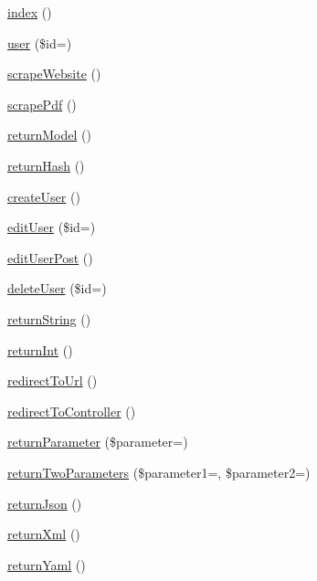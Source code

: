 \begin{DoxyCompactItemize}
\item 
\hyperlink{class_basic_a149eb92716c1084a935e04a8d95f7347}{index} ()
\item 
\hyperlink{class_basic_a6603546e99f9519b86989be128736ad6}{user} (\$id=\textquotesingle{}\textquotesingle{})
\item 
\hyperlink{class_basic_a48ffe9a27b91ce968b2bcf5e0a9d4069}{scrape\+Website} ()
\item 
\hyperlink{class_basic_a67dbb38567401c856d5361d6704874d5}{scrape\+Pdf} ()
\item 
\hyperlink{class_basic_a7cb6a02987f0faaef2ee4aff9198907e}{return\+Model} ()
\item 
\hyperlink{class_basic_a16df2136bd66a75022f350d583e6c060}{return\+Hash} ()
\item 
\hyperlink{class_basic_a967982ee98f05287bbdba812f6016947}{create\+User} ()
\item 
\hyperlink{class_basic_acd3b430aeceba0ebbda62330838d0c0b}{edit\+User} (\$id=\textquotesingle{}\textquotesingle{})
\item 
\hyperlink{class_basic_a445a1f2f42c756bf451de087e36b7193}{edit\+User\+Post} ()
\item 
\hyperlink{class_basic_a934aeeec370d904f3a58bde4d514259d}{delete\+User} (\$id=\textquotesingle{}\textquotesingle{})
\item 
\hyperlink{class_basic_a5bb666dcea19a9561c2047cfa25936bd}{return\+String} ()
\item 
\hyperlink{class_basic_a8d2918087022004ef5ad62d8f76a73d7}{return\+Int} ()
\item 
\hyperlink{class_basic_abf786273f796a96f5532dc60f9cec813}{redirect\+To\+Url} ()
\item 
\hyperlink{class_basic_a53f01fc4c43d1cecc497d9645f920407}{redirect\+To\+Controller} ()
\item 
\hyperlink{class_basic_ac380e8a432563c6affcfddd43384c1d2}{return\+Parameter} (\$parameter=\textquotesingle{}\textquotesingle{})
\item 
\hyperlink{class_basic_a2ef87b96abcca966a41e34d077fcc38e}{return\+Two\+Parameters} (\$parameter1=\textquotesingle{}\textquotesingle{}, \$parameter2=\textquotesingle{}\textquotesingle{})
\item 
\hyperlink{class_basic_aab9c1fc26dd9ab7939d5eb9e77c2c4a5}{return\+Json} ()
\item 
\hyperlink{class_basic_ab7183791265fc4aa7b57f81ed4cbf791}{return\+Xml} ()
\item 
\hyperlink{class_basic_a1728e20001f09f21fbf27251f3eeff52}{return\+Yaml} ()
\end{DoxyCompactItemize}
